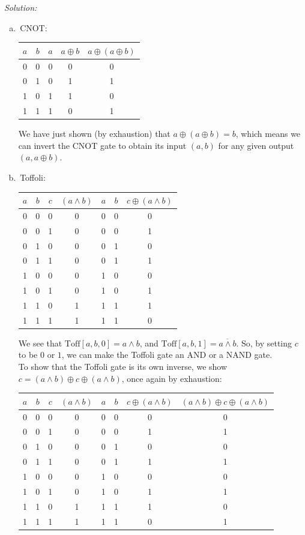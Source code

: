 \documentclass{book}
\theoremstyle{definition}
\begin{document}
\noindent \textit{Solution:} 
\begin{enumerate}[(a)]
	\item 
	$\,$CNOT:\\
	\begin{tabular}{| c  c |  c c| c| }
		\hline
		$a$ & $b$ & $a$ & $a\oplus b$  & $a\oplus(a\oplus b)$ \\
		\hline
		0&0&0&0&0\\
		0&1&0&1&1\\
		1&0&1&1&0\\
		1&1&1&0&1\\
		\hline
	\end{tabular}

	We have just shown (by exhaustion) that $a\oplus(a\oplus b) = b$, which means we can invert the CNOT gate to obtain its input $(a,b)$ for any given output $(a,a\oplus b)$. 
	
	\item 
	$\,$Toffoli:\\
	\begin{tabular}{| c  c  c  c| c c c| }
		\hline
		$a$ & $b$ & $c$ & $(a\land b)$ & $a$ & $b$&  $c\oplus (a\land b)$ \\
		\hline
		0&0&0&0&0&0&0\\
		0&0&1&0&0&0&1\\
		0&1&0&0&0&1&0\\
		0&1&1&0&0&1&1\\
		1&0&0&0&1&0&0\\
		1&0&1&0&1&0&1\\
		1&1&0&1&1&1&1\\
		1&1&1&1&1&1&0\\
		\hline
	\end{tabular}

	We see that $\text{Toff}[a,b,0]=a\land b$, and $\text{Toff}[a,b,1] = \overline{a\land b}$. So, by setting $c$ to be $0$ or $1$, we can make the Toffoli gate an AND or a NAND gate. \\
	
	To show that the Toffoli gate is its own inverse, we show $c = (a\land b) \oplus c\oplus (a\land b)$, once again by exhaustion:\\
	
	\begin{tabular}{| c  c  c  c| c c c| c |}
		\hline
		$a$ & $b$ & $c$ & $(a\land b)$ & $a$ & $b$&  $c\oplus (a\land b)$ & $(a\land b) \oplus c\oplus (a\land b)$  \\
		\hline
		0&0&0&0&0&0&0&0\\
		0&0&1&0&0&0&1&1\\
		0&1&0&0&0&1&0&0\\
		0&1&1&0&0&1&1&1\\
		1&0&0&0&1&0&0&0\\
		1&0&1&0&1&0&1&1\\
		1&1&0&1&1&1&1&0\\
		1&1&1&1&1&1&0&1\\
		\hline
	\end{tabular}


\end{enumerate}
\end{document}
